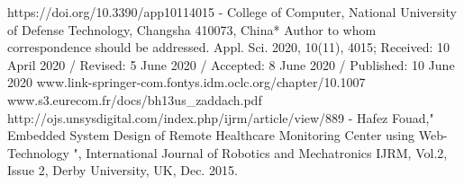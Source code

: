 \documentclass[]{report}
\begin{document}
https://doi.org/10.3390/app10114015 - 
College of Computer, National University of Defense Technology, Changsha 410073, China* 
Author to whom correspondence should be addressed. 
Appl. Sci. 2020, 10(11), 4015;  
Received: 10 April 2020 / Revised: 5 June 2020 / Accepted: 8 June 2020 / Published: 10 June 2020 
\newline
\newline
www.link-springer-com.fontys.idm.oclc.org/chapter/10.1007%
\newline
\newline
www.s3.eurecom.fr/docs/bh13us\_zaddach.pdf
\newline
\newline
http://ojs.unsysdigital.com/index.php/ijrm/article/view/889 - Hafez Fouad," Embedded System Design of Remote Healthcare Monitoring Center using Web-Technology ", International Journal of Robotics and Mechatronics IJRM, Vol.2, Issue 2, Derby University, UK, Dec. 2015.
\end{document}
